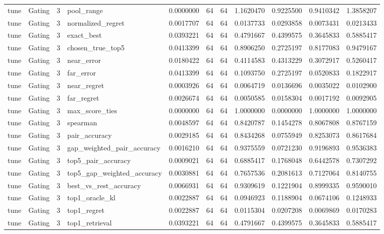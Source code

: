 \begin{tabular}{llrlrrrrrrr}
tune & Gating & 3 & pool_range & 0.0000000 & 64 & 64 & 1.1620470 & 0.9225500 & 0.9410342 & 1.3858207 \\
tune & Gating & 3 & normalized_regret & 0.0017707 & 64 & 64 & 0.0137733 & 0.0293858 & 0.0073431 & 0.0213433 \\
tune & Gating & 3 & exact_best & 0.0393221 & 64 & 64 & 0.4791667 & 0.4399575 & 0.3645833 & 0.5885417 \\
tune & Gating & 3 & chosen_true_top5 & 0.0413399 & 64 & 64 & 0.8906250 & 0.2725197 & 0.8177083 & 0.9479167 \\
tune & Gating & 3 & near_error & 0.0180422 & 64 & 64 & 0.4114583 & 0.4313229 & 0.3072917 & 0.5260417 \\
tune & Gating & 3 & far_error & 0.0413399 & 64 & 64 & 0.1093750 & 0.2725197 & 0.0520833 & 0.1822917 \\
tune & Gating & 3 & near_regret & 0.0003926 & 64 & 64 & 0.0064719 & 0.0136696 & 0.0035022 & 0.0102900 \\
tune & Gating & 3 & far_regret & 0.0026674 & 64 & 64 & 0.0050585 & 0.0158304 & 0.0017192 & 0.0092905 \\
tune & Gating & 3 & max_score_ties & 0.0000000 & 64 & 64 & 1.0000000 & 0.0000000 & 1.0000000 & 1.0000000 \\
tune & Gating & 3 & spearman & 0.0048597 & 64 & 64 & 0.8420787 & 0.1454278 & 0.8067808 & 0.8767159 \\
tune & Gating & 3 & pair_accuracy & 0.0029185 & 64 & 64 & 0.8434268 & 0.0755949 & 0.8253073 & 0.8617684 \\
tune & Gating & 3 & gap_weighted_pair_accuracy & 0.0016210 & 64 & 64 & 0.9375559 & 0.0721230 & 0.9196893 & 0.9536383 \\
tune & Gating & 3 & top5_pair_accuracy & 0.0009021 & 64 & 64 & 0.6885417 & 0.1768048 & 0.6442578 & 0.7307292 \\
tune & Gating & 3 & top5_gap_weighted_accuracy & 0.0030881 & 64 & 64 & 0.7657536 & 0.2081613 & 0.7127064 & 0.8140755 \\
tune & Gating & 3 & best_vs_rest_accuracy & 0.0066931 & 64 & 64 & 0.9309619 & 0.1221904 & 0.8999335 & 0.9590010 \\
tune & Gating & 3 & top1_oracle_kl & 0.0022887 & 64 & 64 & 0.0946923 & 0.1188904 & 0.0674106 & 0.1248933 \\
tune & Gating & 3 & top1_regret & 0.0022887 & 64 & 64 & 0.0115304 & 0.0207208 & 0.0069869 & 0.0170283 \\
tune & Gating & 3 & top1_retrieval & 0.0393221 & 64 & 64 & 0.4791667 & 0.4399575 & 0.3645833 & 0.5885417 \\

\end{tabular}
